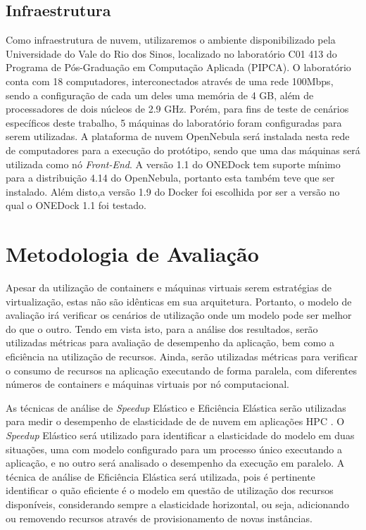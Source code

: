 \documentclass[twoside,english,brazilian]{UNISINOSartigo}
\begin{document}
\subsection{Infraestrutura}

Como infraestrutura de nuvem, utilizaremos o ambiente disponibilizado pela Universidade do Vale do Rio dos Sinos, localizado no laboratório C01 413 do Programa de Pós-Graduação em Computação Aplicada (PIPCA). O laboratório conta com 18 computadores, interconectados através de uma rede 100Mbps, sendo a configuração de cada um deles uma memória de 4 GB, além de processadores de dois núcleos de 2.9 GHz. Porém, para fins de teste de cenários específicos deste trabalho, 5 máquinas do laboratório foram configuradas para serem utilizadas. A plataforma de nuvem OpenNebula será instalada nesta rede de computadores para a execução do protótipo, sendo que uma das máquinas será utilizada como nó \textit{Front-End}. 
A versão 1.1 do ONEDock tem suporte mínimo para a distribuição 4.14 do OpenNebula, portanto esta também teve que ser instalado. Além disto,a versão 1.9 do Docker foi escolhida por ser a versão no qual o ONEDock 1.1 foi testado. 


\section{Metodologia de Avaliação}
\label{avaliacao}

Apesar da utilização de containers e máquinas virtuais serem estratégias de virtualização, estas não são idênticas em sua arquitetura. Portanto, o modelo de avaliação irá verificar os cenários de utilização onde um modelo pode ser melhor do que o outro. Tendo em vista isto, para a análise dos resultados, serão utilizadas métricas para avaliação de desempenho da aplicação, bem como a eficiência na utilização de recursos. Ainda, serão utilizadas métricas para verificar o consumo de recursos na aplicação executando de forma paralela, com diferentes números de containers e máquinas virtuais por nó computacional. 

As técnicas de análise de \textit{Speedup} Elástico e Eficiência Elástica serão utilizadas para medir o desempenho de elasticidade de de nuvem em aplicações HPC \cite{Facco2016}. O \textit{Speedup} Elástico será utilizado para identificar a elasticidade do modelo em duas situações, uma com modelo configurado para um processo único executando a aplicação, e no outro será analisado o desempenho da execução em paralelo. A técnica de análise de Eficiência Elástica será utilizada, pois é pertinente identificar o quão eficiente é o modelo em questão de utilização dos recursos disponíveis, considerando sempre a elasticidade horizontal, ou seja, adicionando ou removendo recursos através de provisionamento de novas instâncias. 
\end{document}

